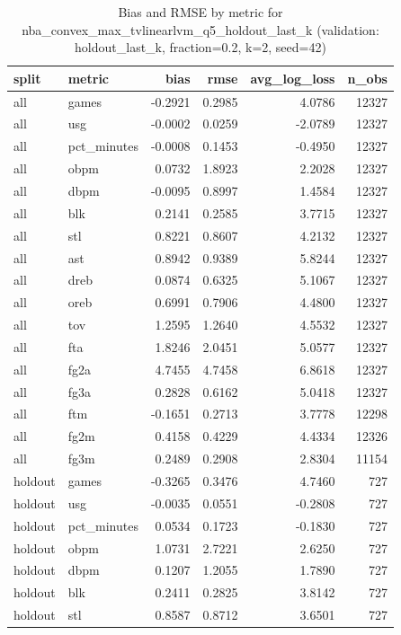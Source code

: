 \begin{table}
\caption{Bias and RMSE by metric for nba_convex_max_tvlinearlvm_q5_holdout_last_k (validation: holdout_last_k, fraction=0.2, k=2, seed=42)}
\label{tab:nba_convex_max_tvlinearlvm_q5_holdout_last_k_vs_holdout_last_k_f20_k2_s42_bias_rmse}
\begin{tabular}{llrrrr}
\toprule
split & metric & bias & rmse & avg\_log\_loss & n\_obs \\
\midrule
all & games & -0.2921 & 0.2985 & 4.0786 & 12327 \\
all & usg & -0.0002 & 0.0259 & -2.0789 & 12327 \\
all & pct\_minutes & -0.0008 & 0.1453 & -0.4950 & 12327 \\
all & obpm & 0.0732 & 1.8923 & 2.2028 & 12327 \\
all & dbpm & -0.0095 & 0.8997 & 1.4584 & 12327 \\
all & blk & 0.2141 & 0.2585 & 3.7715 & 12327 \\
all & stl & 0.8221 & 0.8607 & 4.2132 & 12327 \\
all & ast & 0.8942 & 0.9389 & 5.8244 & 12327 \\
all & dreb & 0.0874 & 0.6325 & 5.1067 & 12327 \\
all & oreb & 0.6991 & 0.7906 & 4.4800 & 12327 \\
all & tov & 1.2595 & 1.2640 & 4.5532 & 12327 \\
all & fta & 1.8246 & 2.0451 & 5.0577 & 12327 \\
all & fg2a & 4.7455 & 4.7458 & 6.8618 & 12327 \\
all & fg3a & 0.2828 & 0.6162 & 5.0418 & 12327 \\
all & ftm & -0.1651 & 0.2713 & 3.7778 & 12298 \\
all & fg2m & 0.4158 & 0.4229 & 4.4334 & 12326 \\
all & fg3m & 0.2489 & 0.2908 & 2.8304 & 11154 \\
holdout & games & -0.3265 & 0.3476 & 4.7460 & 727 \\
holdout & usg & -0.0035 & 0.0551 & -0.2808 & 727 \\
holdout & pct\_minutes & 0.0534 & 0.1723 & -0.1830 & 727 \\
holdout & obpm & 1.0731 & 2.7221 & 2.6250 & 727 \\
holdout & dbpm & 0.1207 & 1.2055 & 1.7890 & 727 \\
holdout & blk & 0.2411 & 0.2825 & 3.8142 & 727 \\
holdout & stl & 0.8587 & 0.8712 & 3.6501 & 727 \\

\end{tabular}
\end{table}
